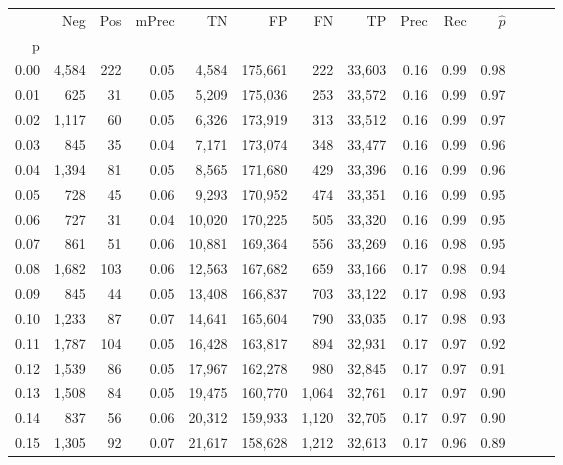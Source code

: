\begin{tabular}{rrrrrrrrrrrrrr}
\toprule
{} &    Neg &  Pos & mPrec &       TN &       FP &      FN &      TP &  Prec &   Rec & $\hat{p}$ \\
p    &        &      &       &          &          &         &         &       &       &           \\
\midrule
0.00 &  4,584 &  222 &  0.05 &    4,584 &  175,661 &     222 &  33,603 &  0.16 &  0.99 &      0.98 \\
0.01 &    625 &   31 &  0.05 &    5,209 &  175,036 &     253 &  33,572 &  0.16 &  0.99 &      0.97 \\
0.02 &  1,117 &   60 &  0.05 &    6,326 &  173,919 &     313 &  33,512 &  0.16 &  0.99 &      0.97 \\
0.03 &    845 &   35 &  0.04 &    7,171 &  173,074 &     348 &  33,477 &  0.16 &  0.99 &      0.96 \\
0.04 &  1,394 &   81 &  0.05 &    8,565 &  171,680 &     429 &  33,396 &  0.16 &  0.99 &      0.96 \\
0.05 &    728 &   45 &  0.06 &    9,293 &  170,952 &     474 &  33,351 &  0.16 &  0.99 &      0.95 \\
0.06 &    727 &   31 &  0.04 &   10,020 &  170,225 &     505 &  33,320 &  0.16 &  0.99 &      0.95 \\
0.07 &    861 &   51 &  0.06 &   10,881 &  169,364 &     556 &  33,269 &  0.16 &  0.98 &      0.95 \\
0.08 &  1,682 &  103 &  0.06 &   12,563 &  167,682 &     659 &  33,166 &  0.17 &  0.98 &      0.94 \\
0.09 &    845 &   44 &  0.05 &   13,408 &  166,837 &     703 &  33,122 &  0.17 &  0.98 &      0.93 \\
0.10 &  1,233 &   87 &  0.07 &   14,641 &  165,604 &     790 &  33,035 &  0.17 &  0.98 &      0.93 \\
0.11 &  1,787 &  104 &  0.05 &   16,428 &  163,817 &     894 &  32,931 &  0.17 &  0.97 &      0.92 \\
0.12 &  1,539 &   86 &  0.05 &   17,967 &  162,278 &     980 &  32,845 &  0.17 &  0.97 &      0.91 \\
0.13 &  1,508 &   84 &  0.05 &   19,475 &  160,770 &   1,064 &  32,761 &  0.17 &  0.97 &      0.90 \\
0.14 &    837 &   56 &  0.06 &   20,312 &  159,933 &   1,120 &  32,705 &  0.17 &  0.97 &      0.90 \\
0.15 &  1,305 &   92 &  0.07 &   21,617 &  158,628 &   1,212 &  32,613 &  0.17 &  0.96 &      0.89 \\

\end{tabular}
